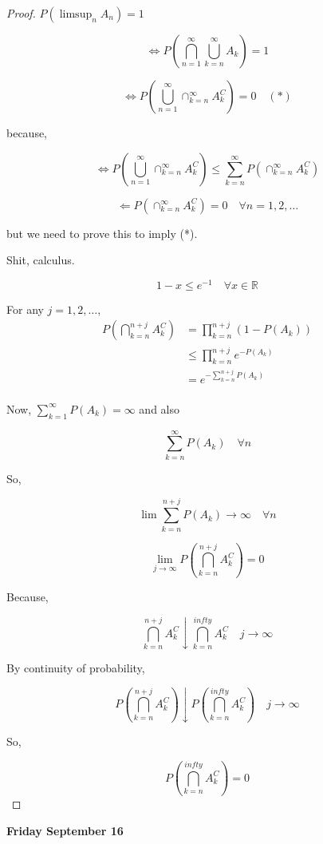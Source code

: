 \documentclass[11pt,fleqn]{book} %
\begin{document}
\begin{proof}
	$P(\limsup_n A_n) = 1$

	$$\Leftrightarrow P(\bigcap ^\infty_{n=1} \bigcup^\infty_{k=n} A_k) = 1 $$

	$$\Leftrightarrow P(\bigcup^\infty_{n=1} \cap^\infty_{k=n} A^C_k) = 0 \quad (*)$$

	because, 

	$$\Leftrightarrow P(\bigcup^\infty_{n=1} \cap^\infty_{k=n} A^C_k) \leq \displaystyle \sum^\infty_{k=n} P(\cap^\infty_{k=n} A_k^C )  $$

	$$\Leftarrow P(\cap^\infty_{k=n} A_k^C ) = 0 \quad \forall n = 1, 2, \dots $$

	but we need to prove this to imply (*). 

	Shit, calculus. 

	$$1 - x \leq e^{-1} \quad \forall x \in \mathbb{R} $$


	For any $j = 1, 2, \dots$, 
	\begin{align*}
		P\left( \bigcap ^{n+j}_{k=n} A_k^C \right) &= \prod^{n+j}_{k=n} (1 - P(A_k))\\
			&\leq \prod^{n+j}_{k=n} e^{-P(A_k)}\\
			&= e^{- \sum^{n+j}_{k=n} P(A_k)}\\
	\end{align*}

	Now,  $\sum^{\infty}_{k=1} P(A_k) = \infty$ and also

	$$ \sum^{\infty}_{k=n} P(A_k) \quad \forall n $$

	So, 

	$$\lim \sum^{n+j}_{k=n} P(A_k) \rightarrow \infty \quad \forall n$$

	$$\lim_{j \rightarrow \infty} P\left(\bigcap ^{n+j}_{k=n} A_k^C \right) = 0 $$

	Because, 

	$$\bigcap ^{n+j}_{k=n} A_k^C \downarrow \bigcap ^{infty}_{k=n} A_k^C \quad j \rightarrow \infty $$

	By continuity of probability, 

	$$ P\left(\bigcap ^{n+j}_{k=n} A_k^C \right) \downarrow P\left(\bigcap ^{infty}_{k=n} A_k^C \right)\quad j \rightarrow \infty$$

	So, 

	$$P\left(\bigcap ^{infty}_{k=n} A_k^C \right) = 0 $$

\end{proof}

\textbf{Friday September 16}\\
\end{document}

